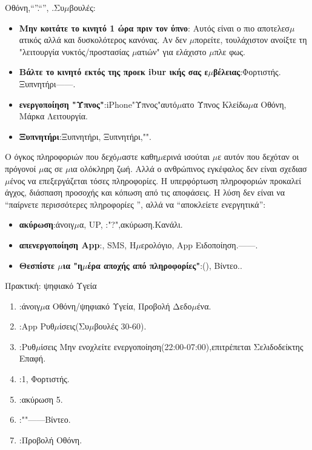 
Οθόνη,“”.“”, .Συ$\mu$βουλές:

\begin{itemize}
  \item \textbf{Μην κοιτάτε το κινητό 1 ώρα πριν τον ύπνο}: Αυτός είναι ο πιο αποτελεσ$\mu$ατικός αλλά και δυσκολότερος κανόνας. Αν δεν $\mu$πορείτε, τουλάχιστον ανοίξτε τη "λειτουργία νυκτός/προστασίας $\mu$ατιών" για ελάχιστο $\mu$πλε φως.
  \item \textbf{Βάλτε το κινητό εκτός της προεκ ibur ικής σας ε$\mu$βέλειας}:Φορτιστής. Ξυπνητήρι——.
  \item \textbf{ενεργοποίηση "Ύπνος"}:iPhone"Ύπνος"αυτό$\mu$ατο Ύπνος Κλείδω$\mu$α Οθόνη, Μάρκα Λειτουργία.
  \item \textbf{Ξυπνητήρι}:Ξυπνητήρι, Ξυπνητήρι,"".
\end{itemize}


Ο όγκος πληροφοριών που δεχό$\mu$αστε καθη$\mu$ερινά ισούται $\mu$ε αυτόν που δεχόταν οι πρόγονοί $\mu$ας σε $\mu$ια ολόκληρη ζωή. Αλλά ο ανθρώπινος εγκέφαλος δεν είναι σχεδιασ$\mu$ένος να επεξεργάζεται τόσες πληροφορίες. Η υπερφόρτωση πληροφοριών προκαλεί άγχος, διάσπαση προσοχής και κόπωση από τις αποφάσεις. Η λύση δεν είναι να “παίρνετε περισσότερες πληροφορίες ”, αλλά να “αποκλείετε ενεργητικά”:

\begin{itemize}
  \item \textbf{ακύρωση}:άνοιγ$\mu$α, UP, :"?",ακύρωση.Κανάλι.
  \item \textbf{απενεργοποίηση App}:, SMS, Η$\mu$ερολόγιο, App Ειδοποίηση.——.
  \item \textbf{Θεσπίστε $\mu$ια "η$\mu$έρα αποχής από πληροφορίες"}:(), Βίντεο..
\end{itemize}

\begin{tcbpractice}{Πρακτική: ψηφιακό Υγεία}
\begin{enumerate}
  \item :άνοιγ$\mu$α Οθόνη/ψηφιακό Υγεία, Προβολή Δεδο$\mu$ένα.
  \item :App Ρυθ$\mu$ίσεις(Συ$\mu$βουλές 30-60).
  \item :Ρυθ$\mu$ίσεις Μην ενοχλείτε ενεργοποίηση(22:00-07:00),επιτρέπεται Σελιδοδείκτης Επαφή.
  \item :1, Φορτιστής.
  \item :ακύρωση 5.
  \item :""——Βίντεο.
  \item :Προβολή Οθόνη.
\end{enumerate}

\end{tcbpractice}

